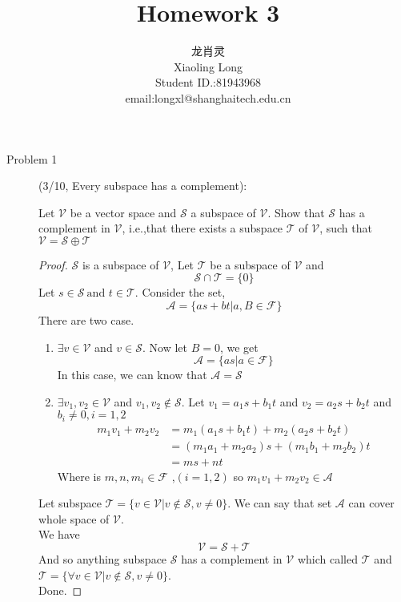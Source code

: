 \documentclass[a4paper]{article}
\title{Homework 3}
\author{龙肖灵 \\Xiaoling Long\\Student ID.:81943968\\email:longxl@shanghaitech.edu.cn}
\begin{document}
\maketitle

\begin{description}
  \item[Problem 1](3/10, Every subspace has a complement):{

  Let $\mathcal{V}$ be a vector space and $\mathcal{S}$ a subspace of $\mathcal{V}$. Show that $\mathcal{S}$ has
  a complement in $\mathcal{V}$, i.e.,that there exists a subspace $\mathcal{T}$ of $\mathcal{V}$,
  such that $\mathcal{V}=\mathcal{S}\oplus \mathcal{T}$}
  \begin{proof}
    $\mathcal{S}$ is a subspace of $\mathcal{V}$, Let $\mathcal{T}$ be a subspace of $\mathcal{V}$ and $$\mathcal{S} \cap
    \mathcal{T} =\{0\} $$
    Let $s \in \mathcal{S} \ \text{and } t \in \mathcal{T}$. Consider the set,$$\mathcal{A}=\{as+bt | a,B \in \mathcal{F}\}$$
    There are two case.
    \begin{enumerate}
      \item $\exists v \in \mathcal{V}$ and $v \in \mathcal{S}$. Now let $B=0$, we get $$\mathcal{A}=\{as | a \in \mathcal{F}\}$$
      In this case, we can know that $\mathcal{A}=\mathcal{S}$
      \item $\exists v_{1},v_{2} \in \mathcal{V}$ and $v_{1},v_{2} \notin \mathcal{S}$. Let $v_{1}=a_{1}s+b_{1}t$
      and $v_{2}=a_{2}s+b_{2}t$ and $b_{i}\ne 0,i=1,2$
      \begin{align*}
        m_{1}v_{1}+m_{2}v_{2}&=m_{1}(a_{1}s+b_{1}t)+m_{2}(a_{2}s+b_{2}t)\\
        &=(m_{1}a_{1}+m_{2}a_{2})s+(m_{1}b_{1}+m_{2}b_{2})t \\
        &=ms+nt
      \end{align*}
      Where is $m,n,m_{i} \in \mathcal{F}$ ,$(i=1,2)$ so $m_{1}v_{1}+m_{2}v_{2}\in \mathcal{A}$
    \end{enumerate}
    Let subspace $\mathcal{T}=\{v\in \mathcal{V}| v\notin \mathcal{S},v\ne 0\}$. We can say that set $\mathcal{A}$ can cover
    whole space of $\mathcal{V}$.\\
    We have $$\mathcal{V}=\mathcal{S}+\mathcal{T}$$
    And so anything subspace $\mathcal{S}$ has a complement in $\mathcal{V}$ which called $\mathcal{T}$ and
    $\mathcal{T}=\{\forall v \in \mathcal{V} | v \notin \mathcal{S},v\ne 0 \}$.\\
    Done.

  \end{proof}


\end{description}
\end{document}
